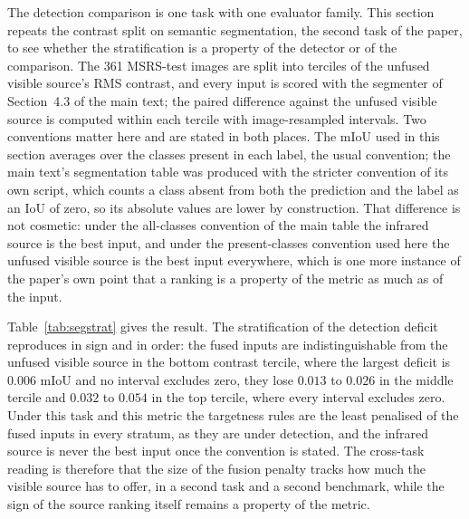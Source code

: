 \documentclass[preprint,12pt,a4paper]{elsarticle}
\begin{document}
The detection comparison is one task with one evaluator family. This section repeats
the contrast split on semantic segmentation, the second task of the paper, to see
whether the stratification is a property of the detector or of the comparison. The
361 MSRS-test images are split into terciles of the unfused visible source's RMS
contrast, and every input is scored with the segmenter of Section~4.3 of the main text;
the paired difference against the unfused visible source is computed within each
tercile with image-resampled intervals. Two conventions matter here and are stated in
both places. The mIoU used in this section averages over the classes present in each
label, the usual convention; the main text's segmentation table was produced with the
stricter convention of its own script, which counts a class absent from both the
prediction and the label as an IoU of zero, so its absolute values are lower by
construction. That difference is not cosmetic: under the all-classes convention of the
main table the infrared source is the best input, and under the present-classes
convention used here the unfused visible source is the best input everywhere, which is
one more instance of the paper's own point that a ranking is a property of the metric
as much as of the input.

Table~\ref{tab:segstrat} gives the result. The stratification of the detection deficit
reproduces in sign and in order: the fused inputs are indistinguishable from the
unfused visible source in the bottom contrast tercile, where the largest deficit is
$0.006$ mIoU and no interval excludes zero, they lose $0.013$ to $0.026$ in the middle
tercile and $0.032$ to $0.054$ in the top tercile, where every interval excludes zero.
Under this task and this metric the targetness rules are the least penalised of the
fused inputs in every stratum, as they are under detection, and the infrared source is
never the best input once the convention is stated. The cross-task reading is
therefore that the size of the fusion penalty tracks how much the visible source has to
offer, in a second task and a second benchmark, while the sign of the source ranking
itself remains a property of the metric.
\end{document}
